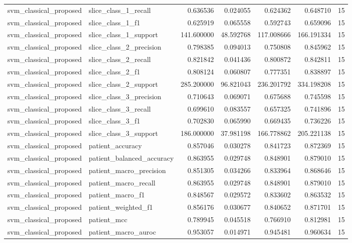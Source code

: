 \begin{tabular}{llrrrrr}
svm_classical_proposed & slice_class_1_recall & 0.636536 & 0.024055 & 0.624362 & 0.648710 & 15 \\
svm_classical_proposed & slice_class_1_f1 & 0.625919 & 0.065558 & 0.592743 & 0.659096 & 15 \\
svm_classical_proposed & slice_class_1_support & 141.600000 & 48.592768 & 117.008666 & 166.191334 & 15 \\
svm_classical_proposed & slice_class_2_precision & 0.798385 & 0.094013 & 0.750808 & 0.845962 & 15 \\
svm_classical_proposed & slice_class_2_recall & 0.821842 & 0.041436 & 0.800872 & 0.842811 & 15 \\
svm_classical_proposed & slice_class_2_f1 & 0.808124 & 0.060807 & 0.777351 & 0.838897 & 15 \\
svm_classical_proposed & slice_class_2_support & 285.200000 & 96.821043 & 236.201792 & 334.198208 & 15 \\
svm_classical_proposed & slice_class_3_precision & 0.710643 & 0.069071 & 0.675688 & 0.745598 & 15 \\
svm_classical_proposed & slice_class_3_recall & 0.699610 & 0.083557 & 0.657325 & 0.741896 & 15 \\
svm_classical_proposed & slice_class_3_f1 & 0.702830 & 0.065990 & 0.669435 & 0.736226 & 15 \\
svm_classical_proposed & slice_class_3_support & 186.000000 & 37.981198 & 166.778862 & 205.221138 & 15 \\
svm_classical_proposed & patient_accuracy & 0.857046 & 0.030278 & 0.841723 & 0.872369 & 15 \\
svm_classical_proposed & patient_balanced_accuracy & 0.863955 & 0.029748 & 0.848901 & 0.879010 & 15 \\
svm_classical_proposed & patient_macro_precision & 0.851305 & 0.034266 & 0.833964 & 0.868646 & 15 \\
svm_classical_proposed & patient_macro_recall & 0.863955 & 0.029748 & 0.848901 & 0.879010 & 15 \\
svm_classical_proposed & patient_macro_f1 & 0.848567 & 0.029572 & 0.833602 & 0.863532 & 15 \\
svm_classical_proposed & patient_weighted_f1 & 0.856176 & 0.030677 & 0.840652 & 0.871701 & 15 \\
svm_classical_proposed & patient_mcc & 0.789945 & 0.045518 & 0.766910 & 0.812981 & 15 \\
svm_classical_proposed & patient_macro_auroc & 0.953057 & 0.014971 & 0.945481 & 0.960634 & 15 \\

\end{tabular}
